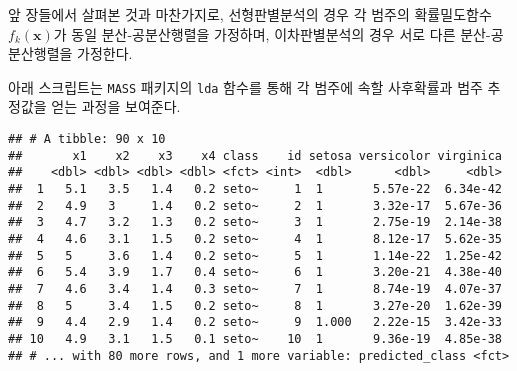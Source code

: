 \documentclass[]{book}
\newenvironment{Shaded}{\begin{snugshade}}{\end{snugshade}}
\newcommand{\DataTypeTok}[1]{\textcolor[rgb]{0.13,0.29,0.53}{#1}}
\newcommand{\KeywordTok}[1]{\textcolor[rgb]{0.13,0.29,0.53}{\textbf{#1}}}
\newcommand{\NormalTok}[1]{#1}
\newcommand{\OperatorTok}[1]{\textcolor[rgb]{0.81,0.36,0.00}{\textbf{#1}}}
\newcommand{\StringTok}[1]{\textcolor[rgb]{0.31,0.60,0.02}{#1}}
\begin{document}
앞 장들에서 살펴본 것과 마찬가지로, 선형판별분석의 경우 각 범주의 확률밀도함수 \(f_k(\mathbf{x})\)가 동일 분산-공분산행렬을 가정하며, 이차판별분석의 경우 서로 다른 분산-공분산행렬을 가정한다.

아래 스크립트는 \texttt{MASS} 패키지의 \texttt{lda} 함수를 통해 각 범주에 속할 사후확률과 범주 추정값을 얻는 과정을 보여준다.

\begin{Shaded}
\end{Shaded}

\begin{verbatim}
## # A tibble: 90 x 10
##       x1    x2    x3    x4 class    id setosa versicolor virginica
##    <dbl> <dbl> <dbl> <dbl> <fct> <int>  <dbl>      <dbl>     <dbl>
##  1   5.1   3.5   1.4   0.2 seto~     1  1       5.57e-22  6.34e-42
##  2   4.9   3     1.4   0.2 seto~     2  1       3.32e-17  5.67e-36
##  3   4.7   3.2   1.3   0.2 seto~     3  1       2.75e-19  2.14e-38
##  4   4.6   3.1   1.5   0.2 seto~     4  1       8.12e-17  5.62e-35
##  5   5     3.6   1.4   0.2 seto~     5  1       1.14e-22  1.25e-42
##  6   5.4   3.9   1.7   0.4 seto~     6  1       3.20e-21  4.38e-40
##  7   4.6   3.4   1.4   0.3 seto~     7  1       8.74e-19  4.07e-37
##  8   5     3.4   1.5   0.2 seto~     8  1       3.27e-20  1.62e-39
##  9   4.4   2.9   1.4   0.2 seto~     9  1.000   2.22e-15  3.42e-33
## 10   4.9   3.1   1.5   0.1 seto~    10  1       9.36e-19  4.85e-38
## # ... with 80 more rows, and 1 more variable: predicted_class <fct>
\end{verbatim}
\end{document}
